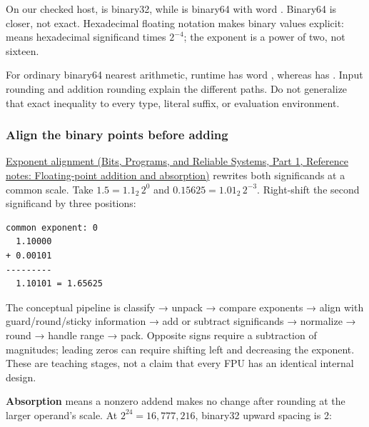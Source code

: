 On our checked host,  is binary32, while  is binary64 with word . Binary64 is closer, not exact. Hexadecimal floating notation makes binary values explicit:  means hexadecimal significand times \(2^{-4}\); the  exponent is a power of two, not sixteen.

For ordinary binary64 nearest arithmetic, runtime  has word , whereas  has . Input rounding and addition rounding explain the different paths. Do not generalize that exact inequality to every type, literal suffix, or evaluation environment.

\subsubsection{Align the binary points before adding}\label{05-engine-i-ch001-align-the-binary-points-before-adding}

\hypertarget{05-engine-i-ch001-align-the-binary-points-before-adding}{}

\href{../01-Bits-Programs-and-Reliable-Systems-P01/main.pdf\#nameddest=appendix-a1b1b4580dfd}{Exponent alignment (Bits, Programs, and Reliable Systems, Part 1, Reference notes: Floating-point addition and absorption)} rewrites both significands at a common scale. Take \(1.5=1.1_2\,2^0\) and \(0.15625=1.01_2\,2^{-3}\). Right-shift the second significand by three positions:

\begin{verbatim}
common exponent: 0
  1.10000
+ 0.00101
---------
  1.10101 = 1.65625
\end{verbatim}

The conceptual pipeline is classify → unpack → compare exponents → align with guard/round/sticky information → add or subtract significands → normalize → round → handle range → pack. Opposite signs require a subtraction of magnitudes; leading zeros can require shifting left and decreasing the exponent. These are teaching stages, not a claim that every FPU has an identical internal design.

\textbf{Absorption} means a nonzero addend makes no change after rounding at the larger operand's scale. At \(2^{24}=16{,}777{,}216\), binary32 upward spacing is 2:

